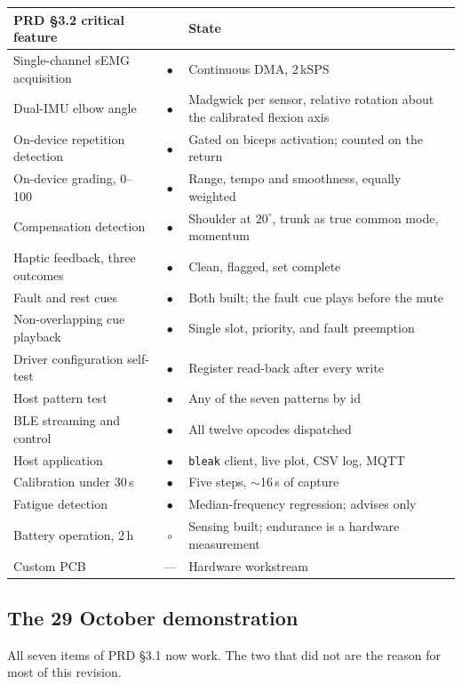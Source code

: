 \documentclass[11pt]{article}
\newcommand{\mY}{{\color{good}$\bullet$}}
\newcommand{\mP}{{\color{marker}$\circ$}}
\begin{document}
\begin{table}[H]
\centering\small
\begin{tabularx}{\linewidth}{@{}p{48mm} c X@{}}
\toprule
\textbf{PRD \S3.2 critical feature} & & \textbf{State} \\
\midrule
Single-channel sEMG acquisition & \mY & Continuous DMA, 2\,kSPS \\
Dual-IMU elbow angle & \mY & Madgwick per sensor, relative rotation about the calibrated flexion axis \\
On-device repetition detection & \mY & Gated on biceps activation; counted on the return \\
On-device grading, 0--100 & \mY & Range, tempo and smoothness, equally weighted \\
Compensation detection & \mY & Shoulder at $20^{\circ}$, trunk as true common mode, momentum \\
Haptic feedback, three outcomes & \mY & Clean, flagged, set complete \\
Fault and rest cues & \mY & Both built; the fault cue plays before the mute \\
Non-overlapping cue playback & \mY & Single slot, priority, and fault preemption \\
Driver configuration self-test & \mY & Register read-back after every write \\
Host pattern test & \mY & Any of the seven patterns by id \\
BLE streaming and control & \mY & All twelve opcodes dispatched \\
Host application & \mY & \texttt{bleak} client, live plot, CSV log, MQTT \\
Calibration under 30\,s & \mY & Five steps, $\sim$16\,s of capture \\
Fatigue detection & \mY & Median-frequency regression; advises only \\
Battery operation, 2\,h & \mP & Sensing built; endurance is a hardware measurement \\
Custom PCB & --- & Hardware workstream \\
\bottomrule
\end{tabularx}
\end{table}

\subsection{The 29 October demonstration}

All seven items of PRD \S3.1 now work. The two that did not are the reason for
most of this revision.
\end{document}
